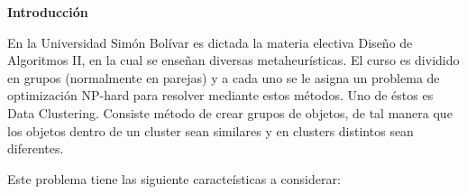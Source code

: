 
\begin{center}
	{\bf Introducción} \label{chap:intro}
\end{center}


\label{sect:motivacion}
\vspace{5 mm}

En la Universidad Sim\'on Bol\'ivar es dictada la materia electiva
Dise\~no de Algoritmos II, en la cual se enseñan diversas metaheur\'isticas.
El curso es dividido en grupos (normalmente en parejas) y a cada uno se le asigna un problema 
de optimizaci\'on NP-hard para resolver mediante estos m\'etodos. Uno de \'estos es Data Clustering.
Consiste m\'etodo de crear grupos de objetos,
de tal manera que los objetos dentro de un cluster sean similares y 
en clusters distintos sean diferentes. \cite{GaChJi2007}

Este problema tiene las siguiente caracte\'isticas a considerar: \cite{SwAjAm2009}

